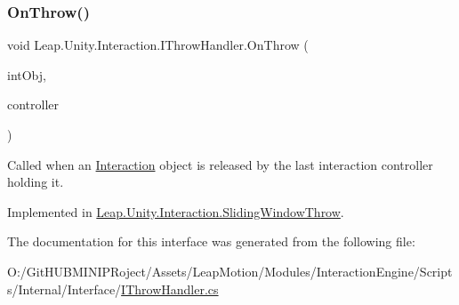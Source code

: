 \subsubsection{\texorpdfstring{OnThrow()}{OnThrow()}}
{\footnotesize\ttfamily void Leap.\+Unity.\+Interaction.\+I\+Throw\+Handler.\+On\+Throw (\begin{DoxyParamCaption}\item[{\mbox{\hyperlink{class_leap_1_1_unity_1_1_interaction_1_1_interaction_behaviour}{Interaction\+Behaviour}}}]{int\+Obj,  }\item[{\mbox{\hyperlink{class_leap_1_1_unity_1_1_interaction_1_1_interaction_controller}{Interaction\+Controller}}}]{controller }\end{DoxyParamCaption})}



Called when an \mbox{\hyperlink{namespace_leap_1_1_unity_1_1_interaction}{Interaction}} object is released by the last interaction controller holding it. 



Implemented in \mbox{\hyperlink{class_leap_1_1_unity_1_1_interaction_1_1_sliding_window_throw_adff33de5d0a761227c5e3ebd80e12e96}{Leap.\+Unity.\+Interaction.\+Sliding\+Window\+Throw}}.



The documentation for this interface was generated from the following file\+:\begin{DoxyCompactItemize}
\item 
O\+:/\+Git\+H\+U\+B\+M\+I\+N\+I\+P\+Roject/\+Assets/\+Leap\+Motion/\+Modules/\+Interaction\+Engine/\+Scripts/\+Internal/\+Interface/\mbox{\hyperlink{_i_throw_handler_8cs}{I\+Throw\+Handler.\+cs}}\end{DoxyCompactItemize}
